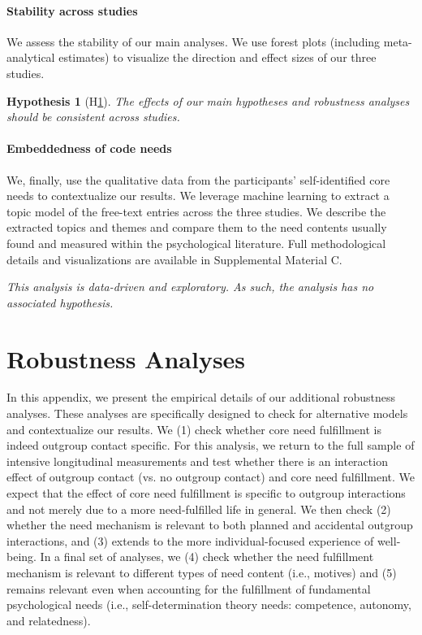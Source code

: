 \documentclass[man, 12pt, a4paper, mask]{apa7}
\theoremstyle{break}
\theoremstyle{plain}
\newtheorem{hyp}{Hypothesis}
\begin{document}
\paragraph{Stability across studies}
We assess the stability of our main analyses. We use forest plots (including meta-analytical estimates) to visualize the direction and effect sizes of our three studies.

\begin{mdframed}[style=mdfhypothesis]
    \begin{hyp}[H\ref{hyp:Stability}] \label{hyp:Stability}
    \addtolength{\leftskip}{1em}
    The effects of our main hypotheses and robustness analyses should be consistent across studies.
    \end{hyp}
\end{mdframed}

\paragraph{Embeddedness of code needs}
We, finally, use the qualitative data from the participants' self-identified core needs to contextualize our results. We leverage machine learning to extract a topic model of the free-text entries across the three studies. We describe the extracted topics and themes and compare them to the need contents usually found and measured within the psychological literature. Full methodological details and visualizations are available in Supplemental Material C.

\begin{mdframed}[style=mdfhypothesis]
    \addtolength{\leftskip}{1em}
    \textit{This analysis is data-driven and exploratory. As such, the analysis has no associated hypothesis.}
\end{mdframed}



\section{Robustness Analyses}
\label{app:AppendixRobustness}

In this appendix, we present the empirical details of our additional robustness analyses. These analyses are specifically designed to check for alternative models and contextualize our results. We (1) check whether core need fulfillment is indeed outgroup contact specific. For this analysis, we return to the full sample of intensive longitudinal measurements and test whether there is an interaction effect of outgroup contact (vs. no outgroup contact) and core need fulfillment. We expect that the effect of core need fulfillment is specific to outgroup interactions and not merely due to a more need-fulfilled life in general. We then check (2) whether the need mechanism is relevant to both planned and accidental outgroup interactions, and (3) extends to the more individual-focused experience of well-being. In a final set of analyses, we (4) check whether the need fulfillment mechanism is relevant to different types of need content (i.e., motives) and (5) remains relevant even when accounting for the fulfillment of fundamental psychological needs (i.e., self-determination theory needs: competence, autonomy, and relatedness).
\end{document}
